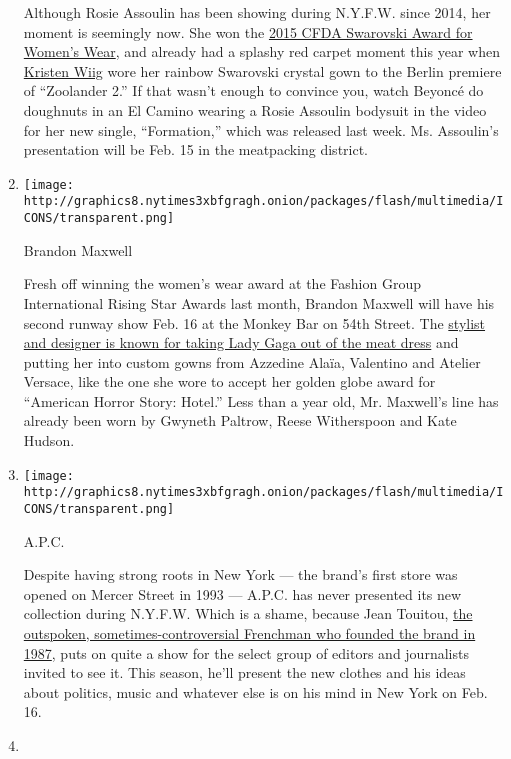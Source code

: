 \begin{enumerate}
  Although Rosie Assoulin has been showing during N.Y.F.W. since 2014,
  her moment is seemingly now. She won the
  \href{http://www.nytimes3xbfgragh.onion/2015/06/03/fashion/the-cfda-awards-winners-surprises-speeches-and-clothes.html?_r=0}{2015
  CFDA Swarovski Award for Women's Wear}, and already had a splashy red
  carpet moment this year when
  \href{http://www.nytimes3xbfgragh.onion/2016/02/03/t-magazine/fashion/kristen-wiig-zoolander-rosie-assoulin-dress.html}{Kristen
  Wiig} wore her rainbow Swarovski crystal gown to the Berlin premiere
  of ``Zoolander 2.'' If that wasn't enough to convince you, watch
  Beyoncé do doughnuts in an El Camino wearing a Rosie Assoulin bodysuit
  in the video for her new single, ``Formation,'' which was released
  last week. Ms. Assoulin's presentation will be Feb. 15 in the
  meatpacking district.
\item
  \texttt{[image: http://graphics8.nytimes3xbfgragh.onion/packages/flash/multimedia/ICONS/transparent.png]}

  Brandon Maxwell

  Fresh off winning the women's wear award at the Fashion Group
  International Rising Star Awards last month, Brandon Maxwell will have
  his second runway show Feb. 16 at the Monkey Bar on 54th Street. The
  \href{http://www.nytimes3xbfgragh.onion/2015/09/10/fashion/new-york-fashion-week-brandon-maxwell-lady-gaga-meat-dress.html}{stylist
  and designer is known for taking Lady Gaga out of the meat dress} and
  putting her into custom gowns from Azzedine Alaïa, Valentino and
  Atelier Versace, like the one she wore to accept her golden globe
  award for ``American Horror Story: Hotel.'' Less than a year old, Mr.
  Maxwell's line has already been worn by Gwyneth Paltrow, Reese
  Witherspoon and Kate Hudson.
\item
  \texttt{[image: http://graphics8.nytimes3xbfgragh.onion/packages/flash/multimedia/ICONS/transparent.png]}

  A.P.C.

  Despite having strong roots in New York --- the brand's first store
  was opened on Mercer Street in 1993 --- A.P.C. has never presented its
  new collection during N.Y.F.W. Which is a shame, because Jean Touitou,
  \href{http://www.theguardian.com/fashion/2015/feb/10/apc-founder-jean-touitou-fashion-designer-french}{the
  outspoken, sometimes-controversial Frenchman who founded the brand in
  1987}, puts on quite a show for the select group of editors and
  journalists invited to see it. This season, he'll present the new
  clothes and his ideas about politics, music and whatever else is on
  his mind in New York on Feb. 16.
\item
\end{enumerate}

